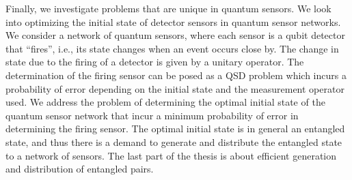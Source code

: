 Finally, we investigate problems that are unique in quantum sensors. We look into optimizing the initial state of detector sensors 
in quantum sensor networks. We consider a network of quantum sensors, where each sensor is a qubit detector that “fires”, 
i.e., its state changes when an event occurs close by. The change in state due to the firing of a detector is given 
by a unitary operator. The determination of the firing sensor can be posed as a QSD problem which incurs a probability 
of error depending on the initial state and the measurement operator used. We address the problem of determining 
the optimal initial state of the quantum sensor network that incur a minimum probability of error in determining the firing sensor.
The optimal initial state is in general an entangled state, and thus there is a demand to generate and distribute the 
entangled state to a network of sensors. The last part of the thesis is about efficient generation and distribution of entangled pairs.
